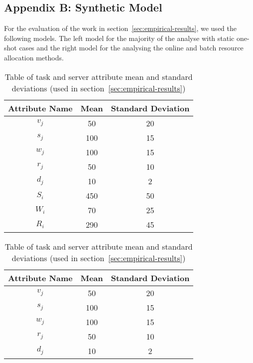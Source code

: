 \subsection*{Appendix B: Synthetic Model}
\label{app:synthetic-model}
For the evaluation of the work in section~\ref{sec:empirical-results}, we used the following models. The left model
for the majority of the analyse with static one-shot cases and the right model for the analysing the online and batch
resource allocation methods.
\begin{table}[h]
    \begin{minipage}{2.8in}
        \begin{tabular}{|c|c|c|}
            \hline
            Attribute Name & Mean & Standard Deviation \\ \hline
            $v_j$          & 50   & 20                 \\ \hline
            $s_j$          & 100  & 15                 \\ \hline
            $w_j$          & 100  & 15                 \\ \hline
            $r_j$          & 50   & 10                 \\ \hline
            $d_j$          & 10   & 2                  \\ \hline
            $S_i$          & 450  & 50                 \\ \hline
            $W_i$          & 70   & 25                 \\ \hline
            $R_i$          & 290  & 45                 \\ \hline
        \end{tabular}
        \caption{Table of task and server attribute mean and standard deviations
        (used in section~\ref{sec:empirical-results})}
    \end{minipage}
    \begin{minipage}{2.8in}
        \begin{tabular}{|c|c|c|}
            \hline
            Attribute Name & Mean & Standard Deviation \\ \hline
            $v_j$          & 50   & 20                 \\ \hline
            $s_j$          & 100  & 15                 \\ \hline
            $w_j$          & 100  & 15                 \\ \hline
            $r_j$          & 50   & 10                 \\ \hline
            $d_j$          & 10   & 2                  \\ \hline

\end{tabular}
\end{minipage}
\end{table}
